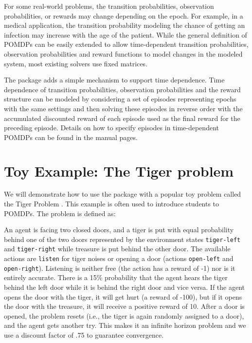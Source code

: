 For some real-world problems, the transition probabilities, observation probabilities, or
rewards may change depending on the epoch. For example, in a medical application, the
transition probability modeling the chance of getting an infection may increase with
the age of the patient.
While the general definition of POMDPs can be easily extended to allow time-dependent transition probabilities, observation
probabilities and reward functions to model changes in the modeled system,
most existing solvers use fixed matrices.

The package  adds a simple mechanism to support time dependence.
Time dependence of transition probabilities, observation probabilities and the reward structure can be modeled by considering a set of episodes representing epochs with the same settings and then solving these
episodes in reverse order with the accumulated discounted reward of each episode used as the final reward for the preceding episode.
Details on how to specify episodes in time-dependent POMDPs can be found in the  manual pages.

\section{Toy Example: The Tiger problem}\label{toy-example-the-tiger-problem}

We will demonstrate how to use the package with a popular toy problem called the Tiger Problem \citep{Cassandra1994}.
This example is often used to introduce students to POMDPs.
The problem is defined as:

An agent is facing two closed doors, and a tiger is put with equal
probability behind one of the two doors represented by the environment states
\texttt{tiger-left} and \texttt{tiger-right} while treasure is put behind the other
door. The available actions are \texttt{listen} for tiger noises or opening a
door (actions \texttt{open-left} and \texttt{open-right}).
Listening is neither free
(the action has a reward of -1) nor is it entirely accurate. There is
a 15\% probability that the agent hears the tiger behind the left door
while it is behind the right door and vice versa. If the
agent opens the door with the tiger, it will get hurt (a reward
of -100), but if it opens the door with the treasure, it will receive
a positive reward of 10. After a door is opened, the problem
resets (i.e., the tiger is again randomly assigned to a door), and the agent gets another try.
This makes it an infinite horizon problem and we use a discount factor
of .75 to guarantee convergence.

